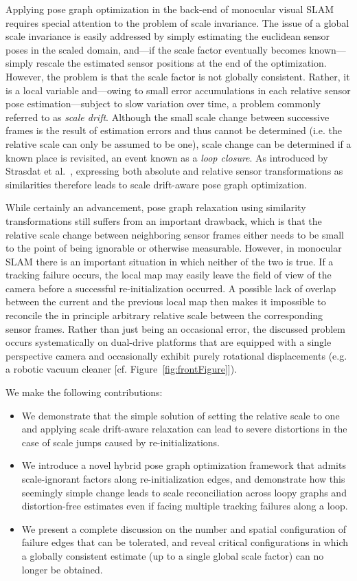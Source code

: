 \documentclass[letterpaper, 10 pt, conference]{ieeeconf}  %
\begin{document}
Applying pose graph optimization in the back-end of monocular visual SLAM requires special attention to the problem of scale invariance. The issue of a global scale invariance is easily addressed by simply estimating the euclidean sensor poses in the scaled domain, and---if the scale factor eventually becomes known---simply rescale the estimated sensor positions at the end of the optimization. However, the problem is that the scale factor is not globally consistent. Rather, it is a local variable and---owing to small error accumulations in each relative sensor pose estimation---subject to slow variation over time, a problem commonly referred to as \textit{scale drift}. Although the small scale change between successive frames is the result of estimation errors and thus cannot be determined (i.e. the relative scale can only be assumed to be one), scale change can be determined if a known place is revisited, an event known as a \textit{loop closure}. As introduced by Strasdat et al.~\cite{strasdat10}, expressing both absolute and relative sensor transformations as similarities therefore leads to scale drift-aware pose graph optimization.

While certainly an advancement, pose graph relaxation using similarity transformations still suffers from an important drawback, which is that the relative scale change between neighboring sensor frames either needs to be small to the point of being ignorable or otherwise measurable. However, in monocular SLAM there is an important situation in which neither of the two is true. If a tracking failure occurs, the local map may easily leave the field of view of the camera before a successful re-initialization occurred. A possible lack of overlap between the current and the previous local map then makes it impossible to reconcile the in principle arbitrary relative scale between the corresponding sensor frames. Rather than just being an occasional error, the discussed problem occurs systematically on dual-drive platforms that are equipped with a single perspective camera and occasionally exhibit purely rotational displacements (e.g. a robotic vacuum cleaner [cf. Figure~\ref{fig:frontFigure}]).

We make the following contributions:
%
\begin{itemize}
\item We demonstrate that the simple solution of setting the relative scale to one and applying scale drift-aware relaxation can lead to severe distortions in the case of scale jumps caused by re-initializations.
\item We introduce a novel hybrid pose graph optimization framework that admits scale-ignorant factors along re-initialization edges, and demonstrate how this seemingly simple change leads to scale reconciliation across loopy graphs and distortion-free estimates even if facing multiple tracking failures along a loop.
\item We present a complete discussion on the number and spatial configuration of failure edges that can be tolerated, and reveal critical configurations in which a globally consistent estimate (up to a single global scale factor) can no longer be obtained.
\end{itemize}
\end{document}
